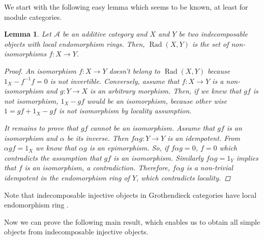\documentclass[12pt]{amsart}
\numberwithin{equation}{section}
\newtheorem{lemma}{Lemma}[section]
\theoremstyle{definition}
\DeclareMathOperator{\Rad}{Rad}
\newtheorem*{theorem 0*}{Theorem}
\newtheorem*{theorem a*}{Theorem A}
\newtheorem*{theorem b*}{Theorem B}
\numberwithin{diagram}{section}
\begin{document}
We start with the following easy lemma which seems to be known, at least for module categories.
	\begin{lemma}\label{3.3}
	Let $\mathcal{A}$ be an additive category and $X$ and $Y$ be two indecomposable objects with local endomorphism rings. Then, $\Rad(X,Y)$ is the set of non-isomorphisms $f:X\rightarrow Y$. 
	\begin{proof}
	An isomorphism $f:X\rightarrow Y$ doesn't belong to $\Rad(X,Y)$ because $1_X-f^{-1}f=0$ is not invertible.
	Conversely, assume that $f:X\rightarrow Y$ is a non-isomorphism and $g:Y\rightarrow X$ is an arbitrary morphism. Then, if we knew that $gf$ is not isomorphism, $1_X-gf$ would be an isomorphism, because other wise $1=gf+1_X-gf$ is not isomorphism by locality assumption.
	
	It remains to prove that $gf$ cannot be an isomorphism. Assume that $gf$ is an isomorphism and $\alpha$ be its inverse. Then $f\alpha g:Y\rightarrow Y$ is an idempotent. From $\alpha gf=1_X$ we know that $\alpha g$ is an epimorphism. So, if $f\alpha g=0$, $f=0$ which contradicts the assumption that $gf$ is an isomorphism.  Similarly $f\alpha g=1_Y$ implies that $f$ is an isomorphism, a contradiction. Therefore, $f\alpha g$ is a non-trivial idempotent in the endomorphism ring of $Y$, which contradicts locality.
	\end{proof}
	\end{lemma}
    
Note that indecomposable injective objects in Grothendieck categories have local endomorphism ring \cite[Lemma 2.5.7]{Kr}.
	 
Now we can prove the following main result, which enables us to obtain all simple objects from indecomposable injective objects.
\end{document}
